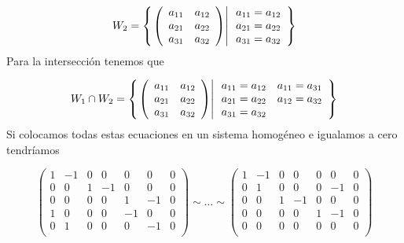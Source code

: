 \begin{enumerate}
\[W_2=\left\{ \left. 
\left(
\begin{array}{rr}
a_{11}&a_{12}\\
a_{21}&a_{22}\\
a_{31}&a_{32}
\end{array}
\right)
\right| 
\begin{array}{r}
a_{11}=a_{12}\\
a_{21}=a_{22}\\
a_{31}=a_{32}
\end{array}
 \right\}
\]
Para la intersecci\'on tenemos que

\[W_1\cap W_2=\left\{ \left. 
\left(
\begin{array}{rr}
a_{11}&a_{12}\\
a_{21}&a_{22}\\
a_{31}&a_{32}
\end{array}
\right)
\right| \begin{array}{rr}
a_{11}=a_{12}&a_{11}=a_{31}\\
a_{21}=a_{22}&a_{12}=a_{32}\\
a_{31}=a_{32}&
\end{array}
 \right\}
\]
Si colocamos todas estas ecuaciones en un sistema homog\'eneo e igualamos a cero tendr\'iamos


\[
\left(
\begin{array}{rrrrrr|r}
1    &-1     &0     &0     &0     &0     &0\\
0    &0      &1     &-1    &0     &0     &0\\
0    &0      &0     &0     &1     &-1     &0\\
1    &0      &0     &0     &-1     &0     &0\\
0    &1     &0     &0     &0     &-1     &0\\
\end{array}
\right)
\sim
\ldots
\sim
\left(
\begin{array}{rrrrrr|r}
1    &-1     &0     &0     &0     &0     &0\\
0    &1     &0     &0     &0     &-1     &0\\
0    &0      &1     &-1    &0     &0     &0\\
0    &0      &0     &0     &1     &-1     &0\\
0    &0      &0     &0     &0     &0     &0\\
\end{array}
\right)
\]


\end{enumerate}
